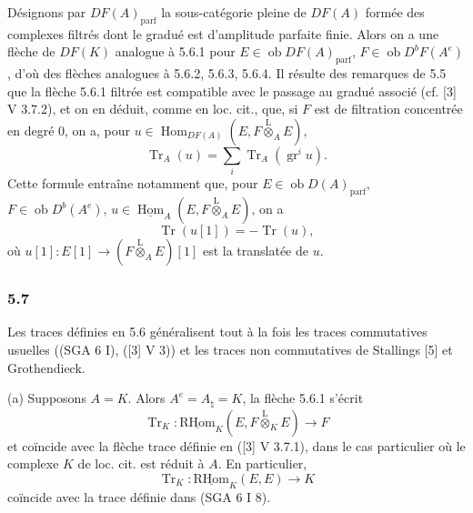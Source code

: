 \documentclass[11pt]{article}
\DeclareMathOperator{\Hom}{Hom}
\newcommand{\ob}{\operatorname{ob}}
\providecommand{\RHom}{\mathrm{RHom}}
\providecommand{\uRHom}{\underline{\RHom}}
\providecommand{\uHom}{\underline{\Hom}}
\providecommand{\Tr}{\operatorname{Tr}}
\providecommand{\Tr}{\operatorname{Tr}}
\providecommand{\lten}{\overset{\mathrm L}{\otimes}}
\providecommand{\Tr}{\operatorname{Tr}}
\providecommand{\RHom}{\mathrm{RHom}}
\providecommand{\Hom}{\operatorname{Hom}}
\providecommand{\ob}{\operatorname{ob}}
\providecommand{\lten}{\overset{\mathrm L}{\otimes}}
\providecommand{\RHom}{\mathrm R\mathcal{H}om}
\providecommand{\lten}{\overset{\mathrm L}{\otimes}}
\providecommand{\Tr}{\operatorname{Tr}}
\providecommand{\lten}{\overset{\mathrm L}{\otimes}}
\providecommand{\lten}{\overset{\mathrm L}{\otimes}}
\providecommand{\lten}{\overset{\mathrm L}{\otimes}}
\providecommand{\RHom}{\mathrm{RHom}}
\providecommand{\Hom}{\operatorname{Hom}}
\providecommand{\Tr}{\operatorname{Tr}}
\providecommand{\lten}{\overset{\mathrm L}{\otimes}}
\begin{document}
Désignons par $DF(A)_{\mathrm{parf}}$ la sous-catégorie pleine de $DF(A)$ formée des complexes filtrés dont le gradué est d'amplitude parfaite finie. Alors on a une flèche de $DF(K)$ analogue à 5.6.1 pour $E\in\ob DF(A)_{\mathrm{parf}}$, $F\in\ob D^bF(A^e)$, d'où des flèches analogues à 5.6.2, 5.6.3, 5.6.4. Il résulte des remarques de 5.5 que la flèche 5.6.1 filtrée est compatible avec le passage au gradué associé (cf. [3] V 3.7.2), et on en déduit, comme en loc. cit., que, si $F$ est de filtration concentrée en degré $0$, on a, pour $u\in\Hom_{DF(A)}(E,F\lten_AE)$,
\begin{equation}\tag{5.6.5}
\Tr_A(u)=\sum_i\Tr_A(\operatorname{gr}^i u).
\end{equation}
Cette formule entraîne notamment que, pour $E\in\ob D(A)_{\mathrm{parf}}$, $F\in\ob D^b(A^e)$, $u\in\uHom_A(E,F\lten_AE)$, on a
\begin{equation}\tag{5.6.6}
\Tr(u[1])=-\Tr(u),
\end{equation}
où $u[1]:E[1]\to(F\lten_AE)[1]$ est la translatée de $u$.

\subsubsection*{5.7}

Les traces définies en 5.6 généralisent tout à la fois les traces commutatives usuelles ((SGA 6 I), ([3] V 3)) et les traces non commutatives de Stallings [5] et Grothendieck.

(a) Supposons $A=K$. Alors $A^e=A_\natural=K$, la flèche 5.6.1 s'écrit
\[
\Tr_K:\uRHom_K(E,F\lten_KE)\longrightarrow F
\]
et coïncide avec la flèche trace définie en ([3] V 3.7.1), dans le cas particulier où le complexe $K$ de loc. cit. est réduit à $A$. En particulier,
\[
\Tr_K:\uRHom_K(E,E)\longrightarrow K
\]
coïncide avec la trace définie dans (SGA 6 I 8).
\end{document}

